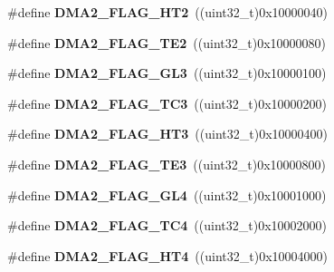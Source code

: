 \begin{DoxyCompactItemize}
\item 
\hypertarget{group__DMA__flags__definition_gaa4ecfdaca0509737af68143d23d0267c}{
\#define {\bfseries DMA2\_\-FLAG\_\-HT2}~((uint32\_\-t)0x10000040)}
\label{group__DMA__flags__definition_gaa4ecfdaca0509737af68143d23d0267c}

\item 
\hypertarget{group__DMA__flags__definition_ga3d396b14851e789ad549126da55b7f3f}{
\#define {\bfseries DMA2\_\-FLAG\_\-TE2}~((uint32\_\-t)0x10000080)}
\label{group__DMA__flags__definition_ga3d396b14851e789ad549126da55b7f3f}

\item 
\hypertarget{group__DMA__flags__definition_ga4c56bb0c92db51e9147b122f2dff1c0a}{
\#define {\bfseries DMA2\_\-FLAG\_\-GL3}~((uint32\_\-t)0x10000100)}
\label{group__DMA__flags__definition_ga4c56bb0c92db51e9147b122f2dff1c0a}

\item 
\hypertarget{group__DMA__flags__definition_ga3b704db8a45d4410509f3552e8b2095f}{
\#define {\bfseries DMA2\_\-FLAG\_\-TC3}~((uint32\_\-t)0x10000200)}
\label{group__DMA__flags__definition_ga3b704db8a45d4410509f3552e8b2095f}

\item 
\hypertarget{group__DMA__flags__definition_ga1af48c549d9aa04e8161cb8b398ef39c}{
\#define {\bfseries DMA2\_\-FLAG\_\-HT3}~((uint32\_\-t)0x10000400)}
\label{group__DMA__flags__definition_ga1af48c549d9aa04e8161cb8b398ef39c}

\item 
\hypertarget{group__DMA__flags__definition_gacdf472c665395a07681a7d499ac0f0bb}{
\#define {\bfseries DMA2\_\-FLAG\_\-TE3}~((uint32\_\-t)0x10000800)}
\label{group__DMA__flags__definition_gacdf472c665395a07681a7d499ac0f0bb}

\item 
\hypertarget{group__DMA__flags__definition_ga624ff69707b76813a2170e4b1e0bda71}{
\#define {\bfseries DMA2\_\-FLAG\_\-GL4}~((uint32\_\-t)0x10001000)}
\label{group__DMA__flags__definition_ga624ff69707b76813a2170e4b1e0bda71}

\item 
\hypertarget{group__DMA__flags__definition_gad4f76b7a22233dbb9daaad448c431165}{
\#define {\bfseries DMA2\_\-FLAG\_\-TC4}~((uint32\_\-t)0x10002000)}
\label{group__DMA__flags__definition_gad4f76b7a22233dbb9daaad448c431165}

\item 
\hypertarget{group__DMA__flags__definition_ga3dde40e2dbcdb12e4c1a2a2b5a8b3a60}{
\#define {\bfseries DMA2\_\-FLAG\_\-HT4}~((uint32\_\-t)0x10004000)}
\label{group__DMA__flags__definition_ga3dde40e2dbcdb12e4c1a2a2b5a8b3a60}


\end{DoxyCompactItemize}
